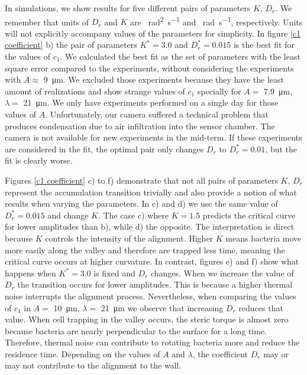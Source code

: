 In simulations, we show results for five different pairs of parameters $K$, $D_r$.  We remember that units of $D_r$ and $K$ are \SI[per-mode = symbol]{}{\square\radian\per\second} and \SI[per-mode = symbol]{}{\radian\per\second}, respectively. Units will not explicitly accompany values of the parameters for simplicity. In figure \ref{c1 coefficient} b) the pair of parameters $K^*=3.0$ and $D_r^*=0.015$ is the best fit for the values of $c_1$. We calculated the best fit as the set of parameters with the least square error compared to the experiments, without considering the experiments with $A\approx$ \SI{9}{\micro\meter}. We excluded those experiments because they have the least amount of realizations and show strange values of $c_1$ specially for $A= $ \SI{7.9}{\micro\meter}, $\lambda=$ \SI{21}{\micro\meter}. We only have experiments performed on a single day for those values of $A$. Unfortunately, our camera suffered a technical problem that produces condensation due to air infiltration into the sensor chamber. The camera is not available for new experiments in the mid-term. If these experiments are considered in the fit, the optimal pair only changes $D_r$ to $D_r^*=0.01$, but the fit is clearly worse.

Figures \ref{c1 coefficient} c) to f) demonstrate that not all pairs of parameters $K$, $D_r$ represent the accumulation transition trivially and also provide a notion of what results when varying the parameters. In c) and d) we use the same value of $D_r^* =0.015$ and change $K$. The case c) where $K=1.5$ predicts the critical curve for lower amplitudes than b), while d) the opposite. The interpretation is direct because $K$ controls the intensity of the alignment. Higher $K$ means bacteria move more easily along the valley and therefore are trapped less time, meaning the critical curve occurs at higher curvature. In contrast, figures e) and f) show what happens when $K^*=3.0$ is fixed and $D_r$ changes. When we increase the value of $D_r$ the transition occurs for lower amplitudes. This is because a higher thermal noise interrupts the alignment process. Nevertheless, when comparing the values of $c_1$ in $A= $ \SI{10}{\micro\meter}, $\lambda=$ \SI{21}{\micro\meter} we observe that increasing $D_r$ reduces that value. When cell trapping in the valley occurs, the steric torque is almost zero because bacteria are nearly perpendicular to the surface for a long time. Therefore, thermal noise can contribute to rotating bacteria more and reduce the residence time. Depending on the values of $A$ and $\lambda$, the coefficient $D_r$ may or may not contribute to the alignment to the wall.  



